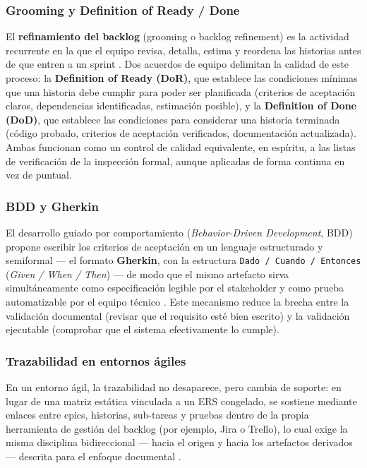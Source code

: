 \documentclass[11pt,a4paper]{article}
\begin{document}
\subsubsection{Grooming y Definition of Ready / Done}
 
El \textbf{refinamiento del backlog} (grooming o backlog refinement) es la
actividad recurrente en la que el equipo revisa, detalla, estima y
reordena las historias antes de que entren a un sprint \cite{cohn2004}.
Dos acuerdos de equipo delimitan la calidad de este proceso: la
\textbf{Definition of Ready (DoR)}, que establece las condiciones mínimas
que una historia debe cumplir para poder ser planificada (criterios de
aceptación claros, dependencias identificadas, estimación posible), y la
\textbf{Definition of Done (DoD)}, que establece las condiciones para
considerar una historia terminada (código probado, criterios de
aceptación verificados, documentación actualizada). Ambas funcionan como
un control de calidad equivalente, en espíritu, a las listas de
verificación de la inspección formal, aunque aplicadas de forma continua
en vez de puntual.
 
\subsubsection{BDD y Gherkin}
 
El desarrollo guiado por comportamiento (\emph{Behavior-Driven
Development}, BDD) propone escribir los criterios de aceptación en un
lenguaje estructurado y semiformal --- el formato \textbf{Gherkin}, con la
estructura \texttt{Dado / Cuando / Entonces} (\emph{Given / When / Then})
--- de modo que el mismo artefacto sirva simultáneamente como
especificación legible por el stakeholder y como prueba automatizable por
el equipo técnico \cite{smart2014}. Este mecanismo reduce la brecha entre
la validación documental (revisar que el requisito esté bien escrito) y la
validación ejecutable (comprobar que el sistema efectivamente lo cumple).
 
\subsubsection{Trazabilidad en entornos ágiles}
 
En un entorno ágil, la trazabilidad no desaparece, pero cambia de soporte:
en lugar de una matriz estática vinculada a un ERS congelado, se sostiene
mediante enlaces entre epics, historias, sub-tareas y pruebas dentro de la
propia herramienta de gestión del backlog (por ejemplo, Jira o Trello),
lo cual exige la misma disciplina bidireccional --- hacia el origen y
hacia los artefactos derivados--- descrita para el enfoque documental
\cite{cleland2012, cohn2004}.
 
\end{document}
